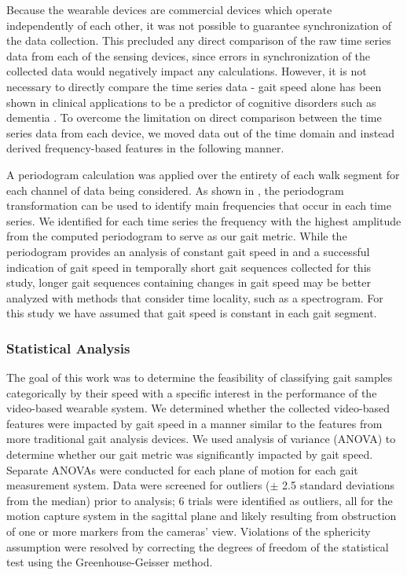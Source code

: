 \documentclass[12pt]{report}
\begin{document}
Because the wearable devices are commercial devices which operate independently of each other, it was not possible to guarantee synchronization of the data collection. This precluded any direct comparison of the raw time series data from each of the sensing devices, since errors in synchronization of the collected data would negatively impact any calculations. However, it is not necessary to directly compare the time series data - gait speed alone has been shown in clinical applications to be a predictor of cognitive disorders such as dementia \cite{Bramell-Risberg2005LowerControls}. To overcome the limitation on direct comparison between the time series data from each device, we moved data out of the time domain and instead derived frequency-based features in the following manner. 

A periodogram calculation was applied over the entirety of each walk segment for each channel of data being considered. As shown in \cite{Schneider2017PreliminaryProcessing}, the periodogram transformation can be used to identify main frequencies that occur in each time series. We identified for each time series the frequency with the highest amplitude from the computed periodogram to serve as our gait metric. While the periodogram provides an analysis of constant gait speed in \cite{Schneider2017PreliminaryProcessing} and a successful indication of gait speed in temporally short gait sequences collected for this study, longer gait sequences containing changes in gait speed may be better analyzed with methods that consider time locality, such as a spectrogram. For this study we have assumed that gait speed is constant in each gait segment.

\subsubsection{Statistical Analysis}
The goal of this work was to determine the feasibility of classifying gait samples categorically by their speed with a specific interest in the performance of the video-based wearable system. We determined whether the collected video-based features were impacted by gait speed in a manner similar to the features from more traditional gait analysis devices. We used analysis of variance (ANOVA) to determine whether our gait metric was significantly impacted by gait speed. Separate ANOVAs were conducted for each plane of motion for each gait measurement system. Data were screened for outliers ($\pm$ 2.5 standard deviations from the median) prior to analysis; 6 trials were identified as outliers, all for the motion capture system in the sagittal plane and likely resulting from obstruction of one or more markers from the cameras' view. Violations of the sphericity assumption were resolved by correcting the degrees of freedom of the statistical test using the Greenhouse-Geisser method.
\end{document}
